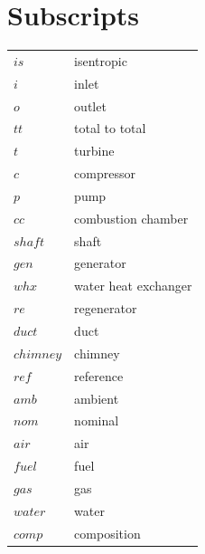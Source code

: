 \documentclass[12pt,a4paper]{report}
\begin{document}
\chapter*{Subscripts}
\begingroup
\setlength{\tabcolsep}{40pt} %
\renewcommand{\arraystretch}{1.5} %
\begin{table}[h]
    \centering
    \begin{tabular}{ll}
        $is$ & isentropic\\ 
        $i$ & inlet\\
        $o$ & outlet\\
        $tt$ & total to total\\
        $t$ & turbine\\
        $c$ & compressor\\
        $p$ & pump\\
        $cc$ & combustion chamber\\
        $shaft$ & shaft\\
        $gen$ & generator\\
        $whx$ & water heat exchanger\\
        $re$ & regenerator\\
        $duct$ & duct\\
        $chimney$ & chimney\\
        $ref$ & reference\\
        $amb$ & ambient\\
        $nom$ & nominal\\
        $air$ & air\\
        $fuel$ & fuel\\
        $gas$ & gas\\
        $water$ & water\\
        $comp$ & composition\\
    \end{tabular}
\end{table}
\endgroup
 \pagestyle{fancy}


\newpage

\newpage

\newpage

\newpage

\newpage

\newpage

\newpage


\newpage





\end{document}
